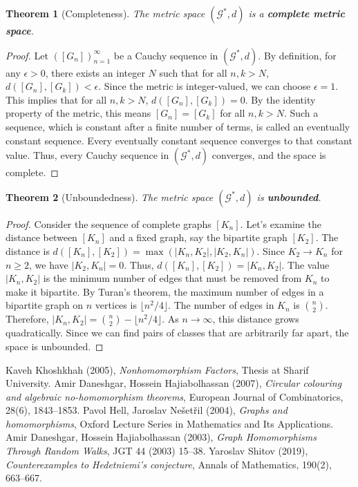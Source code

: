 \documentclass[11pt]{article}
\newtheorem{theorem}{Theorem}[section]
\begin{document}
\begin{theorem}[Completeness]
The metric space $(\mathcal{G}^*, d)$ is a \textbf{complete metric space}.
\end{theorem}
\begin{proof}
Let $([G_n])_{n=1}^\infty$ be a Cauchy sequence in $(\mathcal{G}^*, d)$. By definition, for any $\epsilon > 0$, there exists an integer $N$ such that for all $n, k > N$, $d([G_n], [G_k]) < \epsilon$. Since the metric is integer-valued, we can choose $\epsilon = 1$. This implies that for all $n, k > N$, $d([G_n], [G_k]) = 0$. By the identity property of the metric, this means $[G_n] = [G_k]$ for all $n, k > N$. Such a sequence, which is constant after a finite number of terms, is called an eventually constant sequence. Every eventually constant sequence converges to that constant value. Thus, every Cauchy sequence in $(\mathcal{G}^*, d)$ converges, and the space is complete.
\end{proof}

\begin{theorem}[Unboundedness]
The metric space $(\mathcal{G}^*, d)$ is \textbf{unbounded}.
\end{theorem}
\begin{proof}
Consider the sequence of complete graphs $[K_n]$. Let's examine the distance between $[K_n]$ and a fixed graph, say the bipartite graph $[K_2]$. The distance is $d([K_n], [K_2]) = \max(|K_n, K_2|, |K_2, K_n|)$. Since $K_2 \to K_n$ for $n \ge 2$, we have $|K_2, K_n|=0$. Thus, $d([K_n], [K_2]) = |K_n, K_2|$. The value $|K_n, K_2|$ is the minimum number of edges that must be removed from $K_n$ to make it bipartite. By Turan's theorem, the maximum number of edges in a bipartite graph on $n$ vertices is $\lfloor n^2/4 \rfloor$. The number of edges in $K_n$ is $\binom{n}{2}$. Therefore, $|K_n, K_2| = \binom{n}{2} - \lfloor n^2/4 \rfloor$. As $n \to \infty$, this distance grows quadratically. Since we can find pairs of classes that are arbitrarily far apart, the space is unbounded.
\end{proof}

\begin{thebibliography}{9}
 Kaveh Khoshkhah (2005), \emph{Nonhomomorphism Factors}, Thesis at Sharif University.
 Amir Daneshgar, Hossein Hajiabolhassan (2007), \emph{Circular colouring and algebraic no-homomorphism theorems}, European Journal of Combinatorics, 28(6), 1843–1853.
 Pavol Hell, Jaroslav Nešetřil (2004), \emph{Graphs and homomorphisms}, Oxford Lecture Series in Mathematics and Its Applications.
 Amir Daneshgar, Hossein Hajiabolhassan (2003), \emph{Graph Homomorphisms Through Random Walks}, JGT 44 (2003) 15–38.
 Yaroslav Shitov (2019), \emph{Counterexamples to Hedetniemi’s conjecture}, Annals of Mathematics, 190(2), 663–667.
\end{thebibliography}
\end{document}
